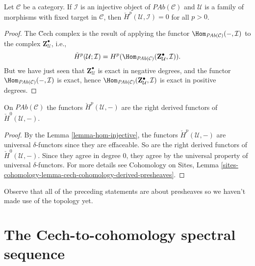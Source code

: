 \begin{lemma}
\label{lemma-hom-injective}
Let $\mathcal{C}$ be a category. If $\mathcal{I}$ is an injective object of
$\textit{PAb}(\mathcal{C})$ and $\mathcal{U}$ is a family of morphisms with
fixed target in $\mathcal{C}$, then $\check H^p(\mathcal{U}, \mathcal{I}) = 0$
for all $p>0$.
\end{lemma}

\begin{proof}
The \u Cech complex is the result of applying the functor
$\Hom_{\textit{PAb}(\mathcal{C})}(-, \mathcal{I}) $ to the complex $
\mathbf{Z}^\bullet_\mathcal{U} $, i.e.,
$$
\check H^p(\mathcal{U} ; \mathcal{I}) = H^p
(\Hom_{\textit{PAb}(\mathcal{C})} (\mathbf{Z}^\bullet_\mathcal{U},
\mathcal{I})).
$$
But we have just seen that $\mathbf{Z}^\bullet_\mathcal{U}$ is exact in
negative degrees, and the functor $\Hom_{\textit{PAb}(\mathcal{C})}(-,
\mathcal{I})$ is exact, hence $\Hom_{\textit{PAb}(\mathcal{C})}
(\mathbf{Z}^\bullet_\mathcal{U}, \mathcal{I})$ is exact in positive degrees.
\end{proof}

\begin{theorem}
\label{theorem-cech-derived}
On $\textit{PAb}(\mathcal{C})$ the functors $\check{H}^p(\mathcal{U}, -)$ are
the right derived functors of $\check{H}^0(\mathcal{U}, -)$.
\end{theorem}

\begin{proof}
By the Lemma \ref{lemma-hom-injective}, the functors $\check
H^p(\mathcal{U}, -)$ are universal $\delta$-functors since they are effaceable.
So are the right derived functors of $\check H^0(\mathcal{U}, -)$. Since they
agree in degree $0$, they agree by the universal property of universal
$\delta$-functors. For more details see
Cohomology on Sites,
Lemma \ref{sites-cohomology-lemma-cech-cohomology-derived-presheaves}.
\end{proof}

\begin{remark}
\label{remark-presheaves-no-topology}
Observe that all of the preceding statements are about presheaves so we haven't
made use of the topology yet.
\end{remark}




\section{The Cech-to-cohomology spectral sequence}
\label{section-cech-ss}

